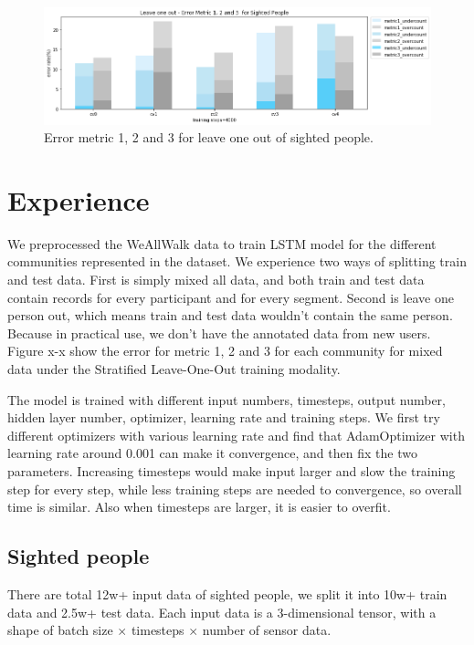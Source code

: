 \documentclass[11pt]{article}
\begin{document}
{\begin{figure}[ht]
\centering
\includegraphics[scale=0.5]{error_metric_123_na_5fold}
\caption{Error metric 1, 2 and 3 for leave one out of sighted people.}
\label{fig:error_metric_123_na_5fold}
\end{figure}


\section{Experience}

We preprocessed the WeAllWalk data to train LSTM model for the different communities represented in the dataset. 
We experience two ways of splitting train and test data. First is simply mixed all data, and both train and test data contain records for every participant and for every segment. Second is leave one person out, which means train and test data wouldn't contain the same person. Because in practical use, we don't have the annotated data from new users. 
Figure x-x show the error for metric 1, 2 and 3 for each community for mixed data under the Stratified Leave-One-Out training modality.

The model is trained with different input numbers, timesteps, output number, hidden layer number, optimizer, learning rate and training steps. We first try different optimizers with various learning rate and find that AdamOptimizer with learning rate around 0.001 can make it convergence, and then fix the two parameters. 
Increasing timesteps would make input larger and slow the training step for every step, while less training steps are needed to convergence, so overall time is similar. Also when timesteps are larger, it is easier to overfit.

\subsection{Sighted people}
There are total 12w+ input data of sighted people, we split it into 10w+ train data and 2.5w+ test data. Each input data is a 3-dimensional tensor, with a shape of batch size $\times$ timesteps $\times$ number of sensor data.

}
\end{document}
